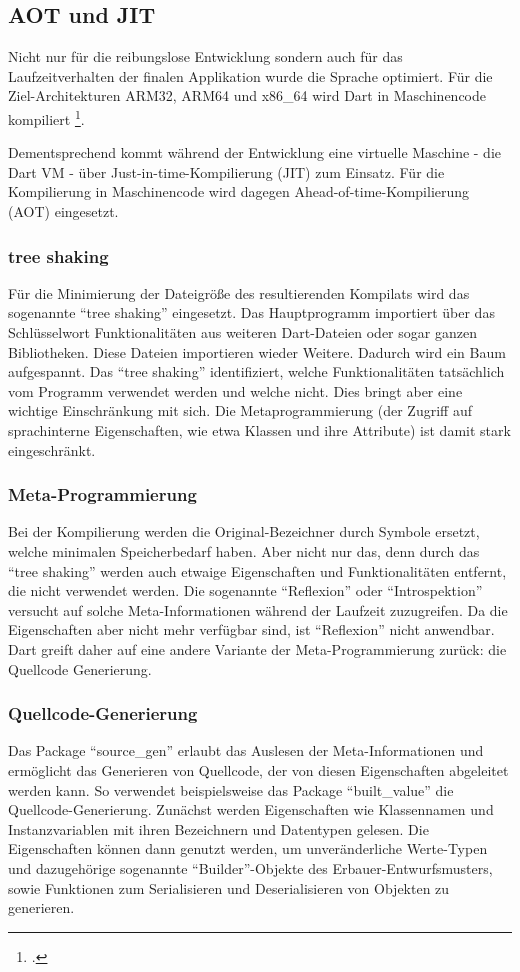 \subsection{AOT und JIT}
Nicht nur für die reibungslose Entwicklung sondern auch für das Laufzeitverhalten der finalen Applikation wurde die Sprache optimiert.
Für die Ziel-Architekturen ARM32, ARM64 und x86_64 wird Dart in Maschinencode kompiliert \footcite[Vgl.][]{DartThePlatforms}.

Dementsprechend kommt während der Entwicklung eine virtuelle Maschine - die Dart VM - über Just-in-time-Kompilierung (JIT) zum Einsatz.
Für die Kompilierung in Maschinencode wird dagegen Ahead-of-time-Kompilierung (AOT) eingesetzt.

\subsubsection{tree shaking}
Für die Minimierung der Dateigröße des resultierenden Kompilats wird das sogenannte \enquote{tree shaking} eingesetzt.
Das Hauptprogramm importiert über das Schlüsselwort  Funktionalitäten aus  weiteren Dart-Dateien oder sogar ganzen Bibliotheken.
Diese Dateien importieren wieder Weitere.
Dadurch wird ein Baum aufgespannt.
Das \enquote{tree shaking} identifiziert, welche Funktionalitäten tatsächlich vom Programm verwendet werden und welche nicht.
Dies bringt aber eine wichtige Einschränkung mit sich.
Die Metaprogrammierung (der Zugriff auf sprachinterne Eigenschaften, wie etwa Klassen und ihre Attribute) ist damit stark eingeschränkt.

\subsubsection{Meta-Programmierung}
Bei der Kompilierung werden die Original-Bezeichner durch Symbole ersetzt, welche minimalen Speicherbedarf haben.
Aber nicht nur das, denn durch das \enquote{tree shaking} werden auch etwaige Eigenschaften und Funktionalitäten entfernt, die nicht verwendet werden.
Die sogenannte \enquote{Reflexion} oder \enquote{Introspektion} versucht auf solche Meta-Informationen während der Laufzeit zuzugreifen.
Da die Eigenschaften aber nicht mehr verfügbar sind, ist \enquote{Reflexion} nicht anwendbar.
Dart greift daher auf eine andere Variante der Meta-Programmierung zurück: die Quellcode Generierung.

\subsubsection{Quellcode-Generierung}
Das Package \enquote{source_gen} erlaubt das Auslesen der Meta-Informationen und ermöglicht das Generieren von Quellcode, der von diesen Eigenschaften abgeleitet werden kann.
So verwendet beispielsweise das Package \enquote{built_value} die Quellcode-Generierung.
Zunächst werden Eigenschaften wie Klassennamen und Instanzvariablen mit ihren Bezeichnern und Datentypen gelesen.
Die Eigenschaften können dann genutzt werden, um unveränderliche Werte-Typen und dazugehörige sogenannte \enquote{Builder}-Objekte des Erbauer-Entwurfsmusters, sowie Funktionen zum Serialisieren und Deserialisieren von Objekten zu generieren.

